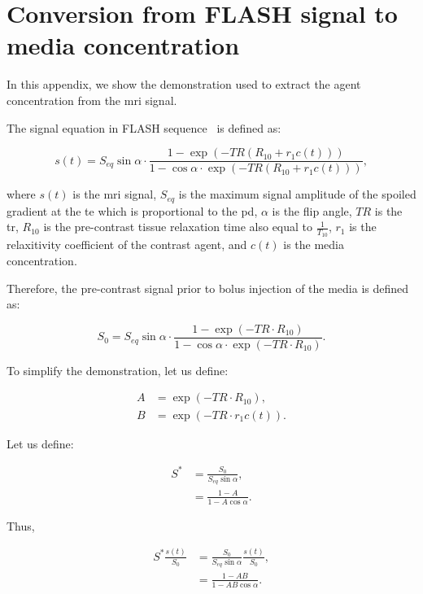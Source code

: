 \appendix
\section{Conversion from FLASH signal to media concentration}\label{app:signaltoconc}

In this appendix, we show the demonstration used to extract the agent concentration from the \ac{mri} signal.

The signal equation in FLASH sequence~\citep{haase1986flash} is defined as:

\begin{equation}
  s(t) = S_{eq} \sin \alpha \cdot \frac{1 - \exp\left(-TR\left(R_{10} + r_1 c(t)\right)\right)}{1 - \cos \alpha \cdot \exp\left(-TR\left(R_{10} + r_1 c(t)\right)\right)} ,
  \label{eq:app:flash}
\end{equation}

\noindent where $s(t)$ is the \ac{mri} signal, $S_{eq}$ is the maximum signal amplitude of the spoiled gradient at the \ac{te} which is proportional to the \ac{pd}, $\alpha$ is the flip angle, $TR$ is the \acf{tr}, $R_{10}$ is the pre-contrast tissue relaxation time also equal to $\frac{1}{T_{10}}$, $r_1$ is the relaxitivity coefficient of the contrast agent, and $c(t)$ is the media concentration.

Therefore, the pre-contrast signal prior to bolus injection of the media is defined as:

\begin{equation}
  S_0 = S_{eq} \sin \alpha \cdot \frac{1 - \exp\left(-TR \cdot R_{10}\right)}{1 - \cos \alpha \cdot \exp\left(-TR \cdot R_{10}\right)} .
  \label{eq:app:precontrast}
\end{equation}

To simplify the demonstration, let us define:

\begin{align}
  A &= \exp(-TR \cdot R_{10}) , \\
  B &= \exp(-TR \cdot r_1 c(t)) .
\end{align}

Let us define:

\begin{align}
  S^{*} &= \frac{S_0}{S_{eq} \sin \alpha} , \\
  &= \frac{1 - A}{1 - A \cos \alpha} .
\end{align}

Thus,

\begin{align}
  S^{*}\frac{s(t)}{S_0} &= \frac{S_0}{S_{eq}\sin \alpha} \frac{s(t)}{S_0} , \\
  &= \frac{1 - A B}{1 - A B \cos \alpha} .
\end{align}

